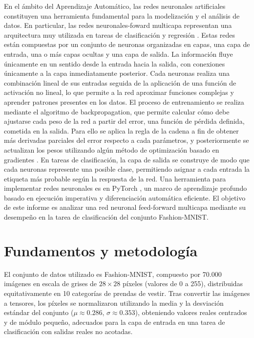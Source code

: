 \documentclass[aps,prl,twocolumn,superscriptaddress]{revtex4-2}
\begin{document}
En el ámbito del Aprendizaje Automático, las redes neuronales artificiales constituyen una herramienta fundamental para la modelización y el análisis de datos. En particular, las redes neuronales-foward multicapa representan una arquitectura muy utilizada en tareas de clasificación y regresión . Estas redes están compuestas por un conjunto de neuronas organizadas en capas, una capa de entrada, una o más capas ocultas y una capa de salida. La información fluye únicamente en un sentido desde la entrada hacia la salida, con conexiones  únicamente a la capa inmediatamente posterior. Cada neuronas realiza una combinación lineal de sus entradas seguida de la aplicación de una función de activación no lineal, lo que permite a la red aproximar funciones complejas y aprender patrones presentes en los datos.
El proceso de entrenamiento se realiza mediante el algoritmo de backpropagation, que permite calcular cómo debe ajustarse cada peso de la red a partir del error, una función de pérdida definida, cometida en la salida. Para ello se aplica la regla de la cadena a fin de obtener más derivadas parciales del error respecto a cada parámetros, y posteriormente se actualizan los pesos utilizando algún método de optimización basado en gradientes \cite{hertz1999introduction}.
En tareas de clasificación, la capa de salida se construye de modo que cada neuronas represente una posible clase, permitiendo asignar a cada entrada la etiqueta más probable según la respuesta de la red.
Una herramienta para implementar redes neuronales es en PyTorch \cite{paszke2019pytorch}, un marco de aprendizaje profundo basado en ejecución imperativa y diferenciación automática eficiente. 
El objetivo de este informe es analizar una red neuronal feed-forward multicapa mediante su desempeño en la tarea de clasificación del conjunto Fashion-MNIST.



\section{Fundamentos y metodología}

El conjunto de datos utilizado es Fashion-MNIST, compuesto por 70.000 imágenes en escala de grises de $28 \times 28$ píxeles (valores de 0 a 255), distribuidas equitativamente en 10 categorías de prendas de vestir. Tras convertir las imágenes a tensores, los píxeles se normalizaron utilizando la media y la desviación estándar del conjunto ($\mu \approx 0.286$, $\sigma \approx 0.353$), obteniendo valores reales centrados y de módulo pequeño, adecuados para la capa de entrada en una tarea de clasificación con salidas reales no acotadas.
\end{document}
